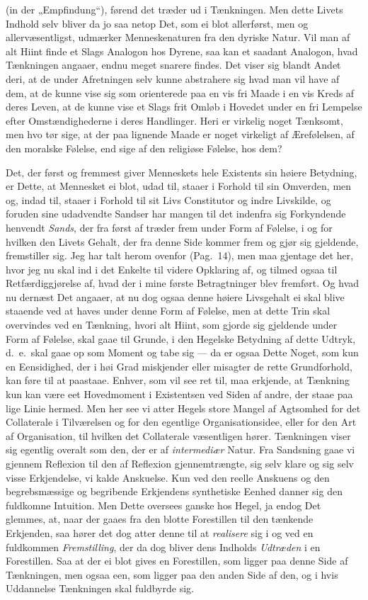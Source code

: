 \documentclass[12pt,a4paper]{book}
\newcommand{\apage}[1]{\marginnote{\footnotesize\textit{[#1]}}}
\begin{document}
(in der „Empfindung“), førend det træder ud i Tænkningen. Men dette Livets
Indhold selv bliver da jo saa netop Det, som ei blot allerførst, men og
allervæsentligst, udmærker Menneskenaturen fra den dyriske Natur. Vil man
af alt Hiint finde et Slags Analogon hos Dyrene, saa kan et saadant
Analogon, hvad Tænkningen angaaer, endnu meget snarere findes. Det viser
sig blandt Andet deri, at de under Afretningen selv kunne abstrahere sig
hvad man vil have af dem, at de kunne vise sig som orienterede paa en vis
fri Maade i en vis Kreds af deres Leven, at de kunne vise et Slags frit
Omløb i Hovedet under en fri Lempelse efter Omstændighederne i deres
Handlinger. Heri er virkelig noget Tænksomt, men hvo tør sige, at der paa
lignende Maade er noget virkeligt af Ærefølelsen, af den moralske Følelse,
end sige af den religiøse Følelse, hos dem?

Det, der først og fremmest giver Menneskets hele Existents sin høiere
Betydning, er Dette, at Mennesket ei blot, udad til, staaer i Forhold til
sin Omverden, men og, indad til, staaer i \apage{95} Forhold til sit Livs Constitutor
og indre Livskilde, og foruden sine udadvendte Sandser har mangen til det
indenfra sig Forkyndende henvendt \emph{Sands}, der fra først af træder frem under
Form af Følelse, i og for hvilken den Livets Gehalt, der fra denne Side
kommer frem og gjør sig gjeldende, fremstiller sig. Jeg har talt herom
ovenfor (Pag.\ 14), men maa gjentage det her, hvor jeg nu skal ind i det
Enkelte til videre Opklaring af, og tilmed ogsaa til Retfærdiggjørelse af,
hvad der i mine første Betragtninger blev fremført. Og hvad nu dernæst Det
angaaer, at nu dog ogsaa denne høiere Livsgehalt ei skal blive staaende ved
at haves under denne Form af Følelse, men at dette Trin skal overvindes ved
en Tænkning, hvori alt Hiint, som gjorde sig gjeldende under Form af
Følelse, skal gaae til Grunde, i den Hegelske Betydning af dette Udtryk,
d.\ e.\ skal gaae op som Moment og tabe sig --- da er ogsaa Dette Noget,
som kun en Eensidighed, der i høi Grad miskjender eller misagter de rette
Grundforhold, kan føre til at paastaae. Enhver, som vil see ret til, maa
erkjende, at Tænkning kun kan være eet Hovedmoment i Existentsen ved Siden
af andre, der staae paa lige Linie hermed. Men her see vi atter Hegels
store Mangel af Agtsomhed for det Collaterale i Tilværelsen og for den
egentlige Organisationsidee, eller for den Art af Organisation, til hvilken
det Collaterale væsentligen hører. Tænkningen viser sig egentlig overalt
som den, der er af \emph{intermediær} Natur. Fra Sandsning gaae vi gjennem
Reflexion til den af Reflexion gjennemtrængte, sig selv klare og sig selv
visse Erkjendelse, vi kalde Anskuelse. Kun ved den reelle Anskuens og den
begrebsmæssige og begribende Erkjendens synthetiske Eenhed danner sig den
fuldkomne Intuition. Men Dette oversees ganske hos Hegel, ja endog Det
glemmes, at, naar der gaaes fra den blotte Forestillen til den tænkende
Erkjenden, saa hører det dog atter denne til at \emph{realisere} sig i og ved en
fuldkommen \emph{Fremstilling}, der da dog bliver dens Indholds \emph{Udtræden} i en
\apage{96} Forestillen. Saa at der ei blot gives en Forestillen, som ligger paa denne
Side af Tænkningen, men ogsaa een, som ligger paa den anden Side af den, og
i hvis Uddannelse Tænkningen skal fuldbyrde sig.
\end{document}
